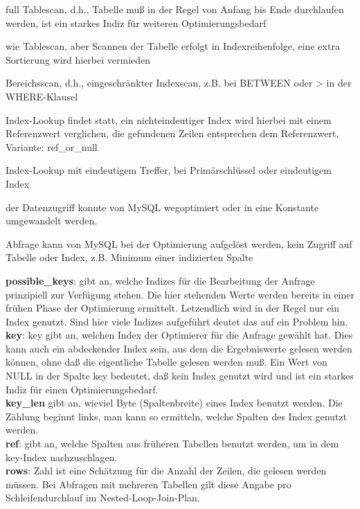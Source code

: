 \begin{description}[font=\ttfamily]
\item[ALL] full Tablescan, d.h., Tabelle muß in der Regel von Anfang bis Ende durchlaufen werden, ist ein starkes Indiz für weiteren Optimierungsbedarf
\item[index] wie Tablescan, aber Scannen der Tabelle erfolgt in Indexreihenfolge, eine extra Sortierung wird hierbei vermieden
\item[range] Bereichsscan, d.h., eingeschränkter Indexscan, z.B. bei BETWEEN oder > in der WHERE-Klausel
\item[ref] Index-Lookup findet statt, ein nichteindeutiger Index wird hierbei mit einem Referenzwert verglichen, die gefundenen Zeilen entsprechen dem Referenzwert, Variante: ref\_or\_null
\item[eq\_ref] Index-Lookup mit eindeutigem Treffer, bei Primärschlüssel oder eindeutigem Index
\item[const,system] der Datenzugriff konnte von MySQL wegoptimiert oder in eine Konstante umgewandelt werden.
\item[NULL] Abfrage kann von MySQL bei der Optimierung aufgelöst werden, kein Zugriff auf Tabelle oder Index, z.B. Minimum einer indizierten Spalte
\end{description}
\textbf{possible\_keys}: gibt an, welche Indizes für die Bearbeitung der Anfrage prinzipiell zur Verfügung stehen.
Die hier stehenden Werte werden bereits in einer frühen Phase der Optimierung ermittelt. Letzendlich wird in der Regel nur ein Index genutzt. Sind hier viele Indizes aufgeführt deutet das auf ein Problem hin.\\
\textbf{key}: key gibt an, welchen Index der Optimierer für die Anfrage gewählt hat. Dies kann auch ein abdeckender Index sein, aus dem die Ergebniswerte gelesen werden können, ohne daß die eigentliche Tabelle gelesen werden muß. Ein Wert von NULL in der Spalte key bedeutet, daß kein Index genutzt wird und ist ein starkes Indiz für einen Optimierungsbedarf.\\
\textbf{key\_len} gibt an, wieviel Byte (Spaltenbreite) eines Index benutzt werden. Die Zählung beginnt links, man kann so ermitteln, welche Spalten des Index genutzt werden.\\
\textbf{ref}: gibt an, welche Spalten aus früheren Tabellen benutzt werden, um in dem key-Index nachzuschlagen.\\
\textbf{rows}: Zahl ist eine Schätzung für die Anzahl der Zeilen, die gelesen werden müssen.
Bei Abfragen mit mehreren Tabellen gilt diese Angabe pro Schleifendurchlauf im Nested-Loop-Join-Plan.
